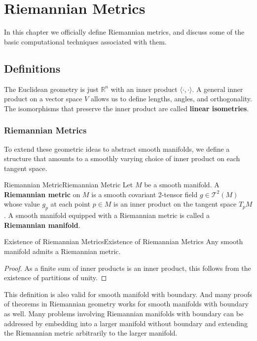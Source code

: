 \documentclass[../main.tex]{subfiles}
\begin{document}
\chapter{Riemannian Metrics}

In this chapter we officially define Riemannian metrics, and discuss some of the basic computational techniques associated with them.

\section{Definitions}
The Euclidean geometry is just $\mathbb{R}^n$ with an inner product $\langle \cdot, \cdot \rangle$. A general inner product on a vector space $V$ allows us to define lengths, angles, and orthogonality. The isomorphisms that preserve the inner product are called \textbf{linear isometries}.

\subsection{Riemannian Metrics}
To extend these geometric ideas to abstract smooth manifolds, we define a structure that amounts to a smoothly varying choice of inner product on each tangent space.

\begin{definition}{Riemannian Metric}{Riemannian Metric}
	Let $M$ be a smooth manifold. A \textbf{Riemannian metric} on $M$ is a smooth covariant 2-tensor field $g \in \mathcal{T}^2(M)$ whose value $g_p$ at each point $p \in M$ is an inner product on the tangent space $T_pM$. A smooth manifold equipped with a Riemannian metric is called a \textbf{Riemannian manifold}.
\end{definition}

\begin{proposition}{Existence of Riemannian Metrics}{Existence of Riemannian Metrics}
	Any smooth manifold admits a Riemannian metric.
\end{proposition}
\begin{proof}
	As a finite sum of inner products is an inner product, this follows from the existence of partitions of unity.
\end{proof}

This definition is also valid for smooth manifold with boundary. And many proofs of theorems in Riemannian geometry works for smooth manifolds with boundary as well. Many problems involving Riemannian manifolds with boundary can be addressed by embedding into a larger manifold without boundary and extending the Riemannian metric arbitrarily to the larger manifold.
\end{document}

